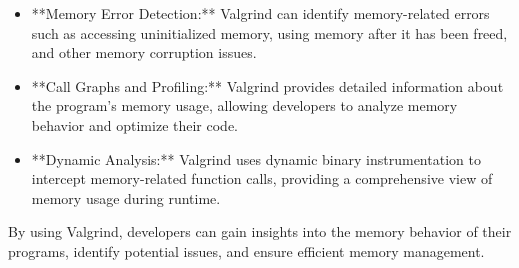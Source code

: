 \documentclass{article}
\begin{document}
\begin{enumerate}
\begin{itemize}
        \item **Memory Error Detection:** Valgrind can identify memory-related errors such as accessing uninitialized memory, using memory after it has been freed, and other memory corruption issues.

        \item **Call Graphs and Profiling:** Valgrind provides detailed information about the program's memory usage, allowing developers to analyze memory behavior and optimize their code.

        \item **Dynamic Analysis:** Valgrind uses dynamic binary instrumentation to intercept memory-related function calls, providing a comprehensive view of memory usage during runtime.
    \end{itemize}

    By using Valgrind, developers can gain insights into the memory behavior of their programs, identify potential issues, and ensure efficient memory management.
\end{enumerate}
\end{document}
